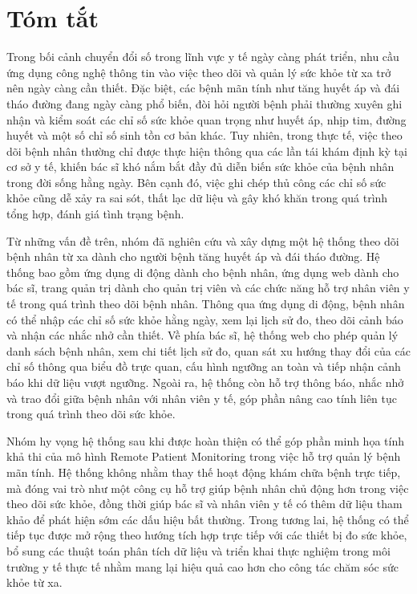 \chapter*{Tóm tắt}
\label{summary}
\par Trong bối cảnh chuyển đổi số trong lĩnh vực y tế ngày càng phát triển, nhu cầu ứng dụng công nghệ thông tin vào việc theo dõi và quản lý sức khỏe từ xa trở nên ngày càng cần thiết. Đặc biệt, các bệnh mãn tính như tăng huyết áp và đái tháo đường đang ngày càng phổ biến, đòi hỏi người bệnh phải thường xuyên ghi nhận và kiểm soát các chỉ số sức khỏe quan trọng như huyết áp, nhịp tim, đường huyết và một số chỉ số sinh tồn cơ bản khác. Tuy nhiên, trong thực tế, việc theo dõi bệnh nhân thường chỉ được thực hiện thông qua các lần tái khám định kỳ tại cơ sở y tế, khiến bác sĩ khó nắm bắt đầy đủ diễn biến sức khỏe của bệnh nhân trong đời sống hằng ngày. Bên cạnh đó, việc ghi chép thủ công các chỉ số sức khỏe cũng dễ xảy ra sai sót, thất lạc dữ liệu và gây khó khăn trong quá trình tổng hợp, đánh giá tình trạng bệnh.

\par Từ những vấn đề trên, nhóm đã nghiên cứu và xây dựng một hệ thống theo dõi bệnh nhân từ xa dành cho người bệnh tăng huyết áp và đái tháo đường. Hệ thống bao gồm ứng dụng di động dành cho bệnh nhân, ứng dụng web dành cho bác sĩ, trang quản trị dành cho quản trị viên và các chức năng hỗ trợ nhân viên y tế trong quá trình theo dõi bệnh nhân. Thông qua ứng dụng di động, bệnh nhân có thể nhập các chỉ số sức khỏe hằng ngày, xem lại lịch sử đo, theo dõi cảnh báo và nhận các nhắc nhở cần thiết. Về phía bác sĩ, hệ thống web cho phép quản lý danh sách bệnh nhân, xem chi tiết lịch sử đo, quan sát xu hướng thay đổi của các chỉ số thông qua biểu đồ trực quan, cấu hình ngưỡng an toàn và tiếp nhận cảnh báo khi dữ liệu vượt ngưỡng. Ngoài ra, hệ thống còn hỗ trợ thông báo, nhắc nhở và trao đổi giữa bệnh nhân với nhân viên y tế, góp phần nâng cao tính liên tục trong quá trình theo dõi sức khỏe.

\par Nhóm hy vọng hệ thống sau khi được hoàn thiện có thể góp phần minh họa tính khả thi của mô hình Remote Patient Monitoring trong việc hỗ trợ quản lý bệnh mãn tính. Hệ thống không nhằm thay thế hoạt động khám chữa bệnh trực tiếp, mà đóng vai trò như một công cụ hỗ trợ giúp bệnh nhân chủ động hơn trong việc theo dõi sức khỏe, đồng thời giúp bác sĩ và nhân viên y tế có thêm dữ liệu tham khảo để phát hiện sớm các dấu hiệu bất thường. Trong tương lai, hệ thống có thể tiếp tục được mở rộng theo hướng tích hợp trực tiếp với các thiết bị đo sức khỏe, bổ sung các thuật toán phân tích dữ liệu và triển khai thực nghiệm trong môi trường y tế thực tế nhằm mang lại hiệu quả cao hơn cho công tác chăm sóc sức khỏe từ xa.